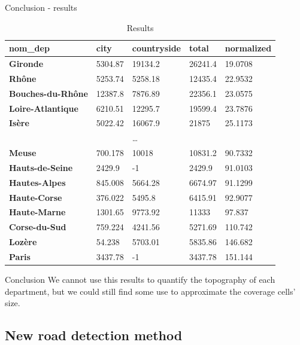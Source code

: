 \begin{frame}{Conclusion - results}
    \begin{table}[!ht]
        \tiny
        \centering
        \begin{tabular}{lllll}
        \hline
            \textbf{nom\_dep} & \textbf{city} & \textbf{countryside} & \textbf{total} & \textbf{normalized} \\ \hline
            \textbf{Gironde} & 5304.87 & 19134.2 & 26241.4 & 19.0708 \\ 
            \textbf{Rhône} & 5253.74 & 5258.18 & 12435.4 & 22.9532 \\ 
            \textbf{Bouches-du-Rhône} & 12387.8 & 7876.89 & 22356.1 & 23.0575 \\ 
            \textbf{Loire-Atlantique} & 6210.51 & 12295.7 & 19599.4 & 23.7876 \\ 
            \textbf{Isère} & 5022.42 & 16067.9 & 21875 & 25.1173 \\ 
             & & \dots & & \\
            \textbf{Meuse} & 700.178 & 10018 & 10831.2 & 90.7332 \\ 
            \textbf{Hauts-de-Seine} & 2429.9 & -1 & 2429.9 & 91.0103 \\ 
            \textbf{Hautes-Alpes} & 845.008 & 5664.28 & 6674.97 & 91.1299 \\ 
            \textbf{Haute-Corse} & 376.022 & 5495.8 & 6415.91 & 92.9077 \\ 
            \textbf{Haute-Marne} & 1301.65 & 9773.92 & 11333 & 97.837 \\ 
            \textbf{Corse-du-Sud} & 759.224 & 4241.56 & 5271.69 & 110.742 \\ 
            \textbf{Lozère} & 54.238 & 5703.01 & 5835.86 & 146.682 \\ 
            \textbf{Paris} & 3437.78 & -1 & 3437.78 & 151.144 \\ \hline
        \end{tabular}
        \caption{Results}
    \end{table}

    \begin{block}{Conclusion}
        We cannot use this results to quantify the topography of each department, but we could still find some use to approximate the coverage cells' size.
    \end{block}
\end{frame}

\subsection{New road detection method}
\insertsubsectionframe

